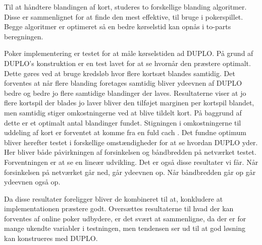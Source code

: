 \documentclass[twoside,11pt,openright]{report}
\begin{document}
Til at håndtere blandingen af kort, studeres to forskellige blanding algoritmer. Disse er sammenlignet for at finde den mest effektive, til bruge i pokerspillet. Begge algoritmer er optimeret så en bedre kørselstid kan opnås i to-parts beregningen.
 
Poker implementering er testet for at måle kørselstiden ad DUPLO. På grund af DUPLO's konstruktion er en test lavet for at se hvornår den præstere optimalt. Dette gøres ved at bruge kredsløb hvor flere kortsæt blandes samtidig. Det forventes at når flere blanding foretages samtidig bliver ydeevnen af DUPLO bedre og bedre jo flere samtidige blandinger der laves. Resultaterne viser at jo flere kortspil der blades jo laver bliver den tilføjet marginen per kortspil blandet, men samtidig stiger omkostningerne ved at blive tildelt kort. På baggrund af dette er et optimalt antal blandinger fundet. Stigningen i omkostningerne til uddeling af kort er forventet at komme fra en fuld    cach    . Det fundne optimum bliver herefter testet i forskellige omstændigheder for at se hvordan DUPLO yder. Her bliver både påvirkningen af forsinkelsen og båndbredden på netværket testet. Forventningen er at se en lineær udvikling. Det er også disse resultater vi får. Når forsinkelsen  på netværket går ned, går ydeevnen op. Når båndbredden går op går ydeevnen også op.
 
Da disse resultater foreligger bliver de kombineret til at, konkludere at implementationen præstere godt. Oversættes resultaterne til hvad der kan forventes af online poker udbydere, er det svært at sammenligne, da der er for mange ukendte variabler i testningen, men tendensen ser ud til at god løsning kan konstrueres med DUPLO.


\end{document}
